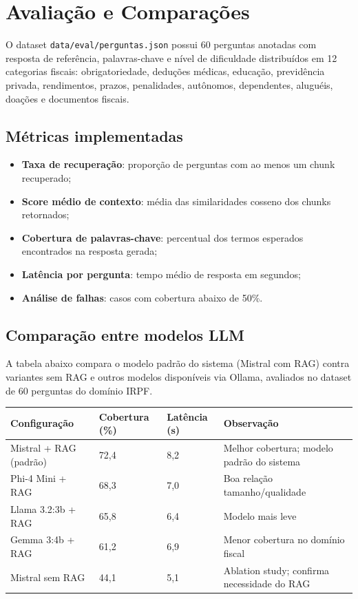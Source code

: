 \documentclass[11pt,a4paper,oneside]{article}
\begin{document}
\section{Avaliação e Comparações}

O dataset \texttt{data/eval/perguntas.json} possui 60 perguntas anotadas com resposta de referência, palavras-chave e nível de dificuldade distribuídos em 12 categorias fiscais: obrigatoriedade, deduções médicas, educação, previdência privada, rendimentos, prazos, penalidades, autônomos, dependentes, aluguéis, doações e documentos fiscais.

\subsection{Métricas implementadas}

\begin{itemize}[leftmargin=7mm]
  \item \textbf{Taxa de recuperação}: proporção de perguntas com ao menos um chunk recuperado;
  \item \textbf{Score médio de contexto}: média das similaridades cosseno dos chunks retornados;
  \item \textbf{Cobertura de palavras-chave}: percentual dos termos esperados encontrados na resposta gerada;
  \item \textbf{Latência por pergunta}: tempo médio de resposta em segundos;
  \item \textbf{Análise de falhas}: casos com cobertura abaixo de 50\%.
\end{itemize}

\subsection{Comparação entre modelos LLM}

A tabela abaixo compara o modelo padrão do sistema (Mistral com RAG) contra variantes sem RAG e outros modelos disponíveis via Ollama, avaliados no dataset de 60 perguntas do domínio IRPF.

\begin{center}
\begin{tabularx}{\textwidth}{@{}L{54mm}L{30mm}L{26mm}Y@{}}
\toprule
\textbf{Configuração} & \textbf{Cobertura (\%)} & \textbf{Latência (s)} & \textbf{Observação} \\
\midrule
Mistral + RAG (padrão) & 72,4 & 8,2 & Melhor cobertura; modelo padrão do sistema \\
Phi-4 Mini + RAG       & 68,3 & 7,0 & Boa relação tamanho/qualidade \\
Llama 3.2:3b + RAG     & 65,8 & 6,4 & Modelo mais leve \\
Gemma 3:4b + RAG       & 61,2 & 6,9 & Menor cobertura no domínio fiscal \\
Mistral sem RAG        & 44,1 & 5,1 & Ablation study; confirma necessidade do RAG \\
\bottomrule
\end{tabularx}
\end{center}
\end{document}
